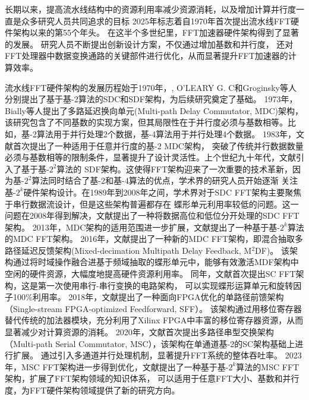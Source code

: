 长期以来，提高流水线结构中的资源利用率减少资源消耗，以及增加计算并行度一直是众多研究人员共同追求的目标
2025年标志着自1970年首次提出流水线FFT硬件架构以来的第55个年头。
在这半个多世纪里，FFT加速器硬件架构得到了显著的发展。
研究人员不断提出创新设计方案，不仅通过增加基数和并行度，
还对FFT处理器中数据变换通路的关键部件进行优化，从而显著提升FFT加速器的计算效率。

流水线FFT硬件架构的发展历程始于1970年，, O'LEARY G. C\cite{o1970nonrecursive}和Groginsky\cite{groginsky1970pipeline}等人
分别提出了基于基-2算法的SDC和SDF架构，为后续研究奠定了基础。
1973年，Bially\cite{gold1973parallelism}等人提出了多路延迟换向单元(Multi-path Delay Commutator, MDC)架构，
该研究包含了不同基数的实现方案，但其局限性在于并行度必须与基数相等。比如，基-2算法用于并行处理2个数据，基-4算法用于并行处理4个数据。
1983年，文献\cite{johnston1983parallel}首次提出了一种适用于任意并行度的基-2 MDC架构，
突破了传统并行数据数量必须与基数相等的限制条件，显著提升了设计灵活性。上个世纪九十年代，文献\cite{he1998design}引入了基于基-$2^2$算法的
SDF架构。这使得FFT架构迎来了一次重要的技术革新，因为基-$2^2$算法同时结合了基-2和基-4算法的优点，学术界的研究人员开始逐渐
关注基-$2^k$硬件架构设计。在1989年到2008年之间，学术界对于SDC FFT架构主要聚焦于串行数据流设计，但是这些架构普遍都存在
蝶形单元利用率较低的问题。这一问题在2008年得到解决，文献\cite{chang2008efficient}提出了一种将数据高位和低位分开处理的SDC FFT架构。
2013年，MDC架构的适用范围进一步扩展，文献\cite{garrido2011pipelined}提出了一种基于基-$2^k$算法的MDC FFT架构。
2016年，文献\cite{wang2015mixed}提出了一种新的MDC FFT架构，即混合抽取多路径延迟反馈架构(Mixed-decimation Multipath Delay Feedback, M$^2$DF)。
该架构通过将时域操作融合进基于频域抽取的蝶形单元中，能够有效激活MDF架构中空闲的硬件资源，大幅度地提高硬件资源利用率。
同年，文献\cite{garrido2016serial}首次提出SC FFT架构，这是第一次使用串行-串行变换的电路架构，
可以实现蝶形运算单元和旋转因子100\%利用率。
2018年，文献\cite{ingemarsson2018sff}提出了一种面向FPGA优化的单路径前馈架构（Single-stream FPGA-optimized Feedforward, SFF）。
该架构通过用移位寄存器替代传统的加法器模块，充分利用了Xilinx FPGA中丰富的移位寄存器资源，从而显著减少对计算资源的消耗。
2020年，文献\cite{dfadfasdf}首次提出多路径串型交换架构（Multi-path Serial Commutator, MSC），该架构在单通道基-2的SC架构基础上进行扩展。
通过引入多通道并行处理机制，显著提升FFT系统的整体吞吐率。
2023年，MSC FFT架构进一步得到优化，文献\cite{article}提出了一种基于基-$2^k$算法的MSC FFT架构，扩展了FFT架构领域的知识体系，
可以适用于任意FFT大小、基数和并行度，为FFT硬件架构领域提供了新的研究方向。


